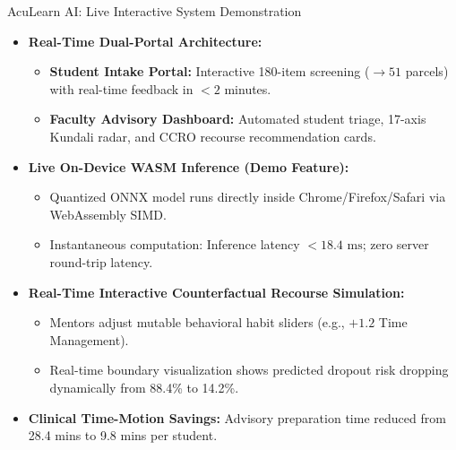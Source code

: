 \documentclass{beamer}
\begin{document}
\begin{frame}{AcuLearn AI: Live Interactive System Demonstration}
  \begin{itemize}\setlength{\itemsep}{6pt}\small
    \item \textbf{Real-Time Dual-Portal Architecture:}
    \begin{itemize}\setlength{\itemsep}{2pt}\footnotesize
      \item \textbf{Student Intake Portal:} Interactive 180-item screening ($\to 51$ parcels) with real-time feedback in $<2$ minutes.
      \item \textbf{Faculty Advisory Dashboard:} Automated student triage, 17-axis Kundali radar, and CCRO recourse recommendation cards.
    \end{itemize}
    \item \textbf{Live On-Device WASM Inference (Demo Feature):}
    \begin{itemize}\setlength{\itemsep}{2pt}\footnotesize
      \item Quantized ONNX model runs directly inside Chrome/Firefox/Safari via WebAssembly SIMD.
      \item Instantaneous computation: Inference latency $< 18.4\text{ ms}$; zero server round-trip latency.
    \end{itemize}
    \item \textbf{Real-Time Interactive Counterfactual Recourse Simulation:}
    \begin{itemize}\setlength{\itemsep}{2pt}\footnotesize
      \item Mentors adjust mutable behavioral habit sliders (e.g., $+1.2$ Time Management).
      \item Real-time boundary visualization shows predicted dropout risk dropping dynamically from 88.4\% to 14.2\%.
    \end{itemize}
    \item \textbf{Clinical Time-Motion Savings:} Advisory preparation time reduced from 28.4 mins to 9.8 mins per student.
  \end{itemize}
\end{frame}
\end{document}
